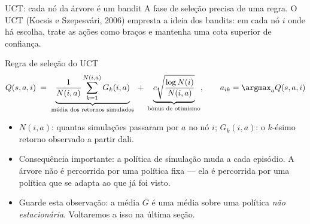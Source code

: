 \documentclass[aspectratio=169, 10pt]{beamer}
\newcommand{\Nvis}{N}
\begin{document}
\begin{frame}{UCT: cada nó da árvore é um bandit}
  \small
  A fase de seleção precisa de uma regra. O UCT (Kocsis e Szepesvári, 2006)
  empresta a ideia dos bandits: em cada nó $i$ onde há escolha, trate as ações
  como braços e mantenha uma cota superior de confiança.

  \begin{teobox}{Regra de seleção do UCT}
    \[
      Q(s,a,i) \;=\; \underbrace{\frac{1}{\Nvis(i,a)}\sum_{k=1}^{\Nvis(i,a)} G_k(i,a)}_{\text{média dos retornos simulados}}
      \;+\; \underbrace{c\sqrt{\frac{\log \Nvis(i)}{\Nvis(i,a)}}}_{\text{bônus de otimismo}},
      \qquad a_{ik} = \argmax_a Q(s,a,i)
    \]
  \end{teobox}

  \begin{itemize}
    \item $\Nvis(i,a)$: quantas simulações passaram por $a$ no nó $i$;
          $G_k(i,a)$: o $k$-ésimo retorno observado a partir dali.
    \item Consequência importante: \alert{a política de simulação muda a cada
          episódio.} A árvore não é percorrida por uma política fixa — ela é
          percorrida por uma política que se adapta ao que já foi visto.
    \item Guarde esta observação: a média $\overline{G}$ é uma média sobre uma
          política \emph{não estacionária}. Voltaremos a isso na última seção.
  \end{itemize}
\end{frame}
\end{document}
